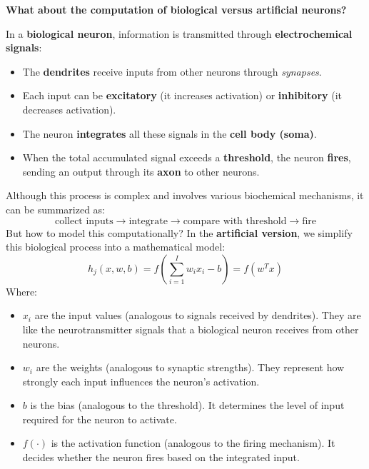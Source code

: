 \begin{flushleft}
    \textcolor{Green3}{ \textbf{What about the computation of biological versus artificial neurons?}}
\end{flushleft}
\textcolor{Red2}{} In a \textbf{biological neuron}, information is transmitted through \textbf{electrochemical signals}:
\begin{itemize}
    \item The \textbf{dendrites} receive inputs from other neurons through \emph{synapses}.
    \item Each input can be \textbf{excitatory} (it increases activation) or \textbf{inhibitory} (it decreases activation).
    \item The neuron \textbf{integrates} all these signals in the \textbf{cell body (soma)}.
    \item When the total accumulated signal exceeds a \textbf{threshold}, the neuron \textbf{fires}, sending an output through its \textbf{axon} to other neurons.
\end{itemize}
Although this process is complex and involves various biochemical mechanisms, it can be summarized as:
\begin{equation*}
    \text{collect inputs} \rightarrow \text{integrate} \rightarrow \text{compare with threshold} \rightarrow \text{fire}
\end{equation*}
\textcolor{Red2}{} But how to model this computationally? In the \textbf{artificial version}, we simplify this biological process into a mathematical model:
\begin{equation*}
    h_{j}\left(x, w, b\right) = f\left(\sum_{i=1}^{I} w_{i} x_{i} - b\right) = f\left(w^{T} x\right)
\end{equation*}
Where:
\begin{itemize}
    \item $x_{i}$ are the input values (analogous to signals received by dendrites). They are like the neurotransmitter signals that a biological neuron receives from other neurons.
    \item $w_{i}$ are the weights (analogous to synaptic strengths). They represent how strongly each input influences the neuron's activation.
    \item $b$ is the bias (analogous to the threshold). It determines the level of input required for the neuron to activate.
    \item $f\left(\cdot\right)$ is the activation function (analogous to the firing mechanism). It decides whether the neuron fires based on the integrated input.
\end{itemize}
